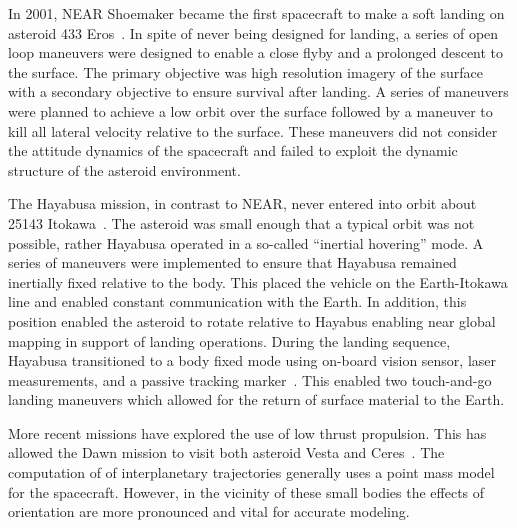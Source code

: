 \documentclass[11pt]{article} %
\begin{document}
In 2001, NEAR Shoemaker became the first spacecraft to make a soft landing on asteroid 433 Eros~\cite{antreasian2002}.
In spite of never being designed for landing, a series of open loop maneuvers were designed to enable a close flyby and a prolonged descent to the surface.
The primary objective was high resolution imagery of the surface with a secondary objective to ensure survival after landing.
A series of maneuvers were planned to achieve a low orbit over the surface followed by a maneuver to kill all lateral velocity relative to the surface. 
These maneuvers did not consider the attitude dynamics of the spacecraft and failed to exploit the dynamic structure of the asteroid environment.

The Hayabusa mission, in contrast to NEAR, never entered into orbit about 25143 Itokawa~\cite{kubota2006}.
The asteroid was small enough that a typical orbit was not possible, rather Hayabusa operated in a so-called ``inertial hovering'' mode.
A series of maneuvers were implemented to ensure that Hayabusa remained inertially fixed relative to the body. 
This placed the vehicle on the Earth-Itokawa line and enabled constant communication with the Earth.
In addition, this position enabled the asteroid to rotate relative to Hayabus enabling near global mapping in support of landing operations.
During the landing sequence, Hayabusa transitioned to a body fixed mode using on-board vision sensor, laser measurements, and a passive tracking marker~\cite{kubota2005}. 
This enabled two touch-and-go landing maneuvers which allowed for the return of surface material to the Earth. 

More recent missions have explored the use of low thrust propulsion.
This has allowed the Dawn mission to visit both asteroid Vesta and Ceres~\cite{rayman2006}.
The computation of of interplanetary trajectories generally uses a point mass model for the spacecraft.
However, in the vicinity of these small bodies the effects of orientation are more pronounced and vital for accurate modeling. 
\end{document}
